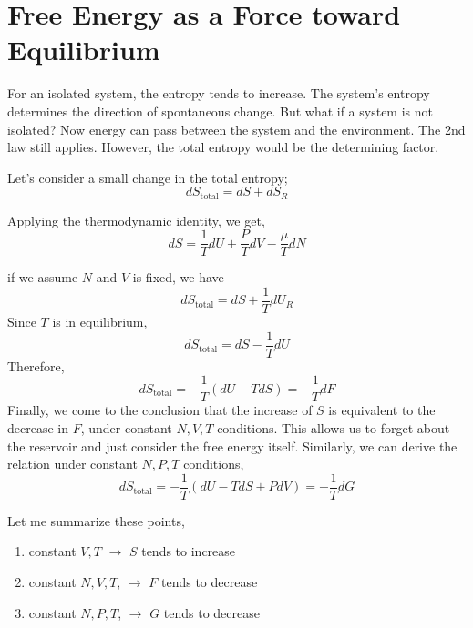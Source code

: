 
\section{Free Energy as a Force toward Equilibrium}
For an isolated system, the entropy tends to increase. The system's entropy determines the direction of spontaneous change. 
But what if a system is not isolated? Now energy can pass between the system and the environment. The 2nd law still applies.
However, the total entropy would be the determining factor.

Let's consider a small change in the total entropy;
\begin{equation} dS_\text{total} = dS + dS_R \end{equation}

Applying the thermodynamic identity, we get,
\begin{equation} dS = \frac{1}{T}dU + \frac{P}{T}dV - \frac{\mu}{T}dN \end{equation}

if we assume $N$ and $V$ is fixed, we have
\begin{equation} dS_\text{total} = dS + \frac{1}{T}dU_R \end{equation}
Since $T$ is in equilibrium,
\begin{equation} dS_\text{total} = dS - \frac{1}{T}dU \end{equation}
Therefore,
\begin{equation} dS_\text{total} = -\frac{1}{T}(dU-TdS) = -\frac{1}{T}dF \end{equation}
Finally, we come to the conclusion that the increase of $S$ is equivalent to the decrease in $F$, under constant $N, V, T$ conditions.
This allows us to forget about the reservoir and just consider the free energy itself.
Similarly, we can derive the relation under constant $N, P, T$ conditions,
\begin{equation} dS_\text{total} = -\frac{1}{T}(dU-TdS+PdV) = -\frac{1}{T}dG \end{equation}

Let me summarize these points,
\begin{enumerate}
\item constant $V, T$ $\rightarrow$ $S$ tends to increase
\item constant $N, V, T$, $\rightarrow$ $F$ tends to decrease
\item constant $N, P, T$, $\rightarrow$ $G$ tends to decrease
\end{enumerate}

